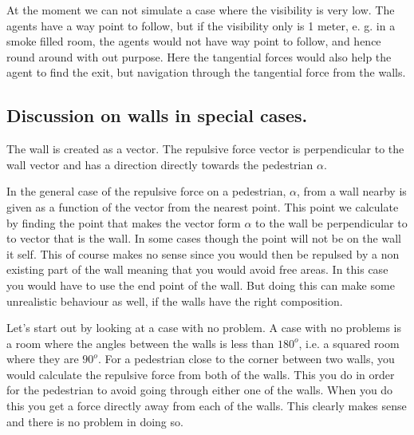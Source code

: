 At the moment we can not simulate a case where the visibility is very low. The agents have a way point to follow,
but if the visibility only is 1 meter, e. g. in a smoke filled room, the agents would not have way point to follow,
and hence round around with out purpose. Here the tangential forces would also help the agent to find the exit,
but navigation through the tangential force from the walls.

\subsection{Discussion on walls in special cases.}\label{wallEndpoints}
The wall is created as a vector. The repulsive force vector is perpendicular to the wall 
vector and has a direction directly towards the pedestrian $\alpha$.

In the general case of the repulsive force on a pedestrian, $\alpha$, from a wall 
nearby is given as a function of the vector from the nearest point. This point we 
calculate by finding the point that makes the vector form $\alpha$ to the wall be 
perpendicular to to vector that is the wall. In some cases though the point will not 
be on the wall it self. This of course makes no sense since you would then be 
repulsed by a non existing part of the wall meaning that you would avoid free 
areas. In this case you would have to use the end point of the wall. But doing this 
can make some unrealistic behaviour as well, if the walls have the right composition. 

Let's start out by looking at a case with no problem. A case with no problems is a 
room where the angles between the walls is less than $180^o$, i.e. a squared room 
where they are $90^o$. For a pedestrian close to the corner between two walls, you 
would calculate the repulsive force from both of the walls. This you do in order 
for the pedestrian to avoid going through either one of the walls. When you do 
this you get a force directly away from each of the walls. This clearly makes 
sense and there is no problem in doing so.


